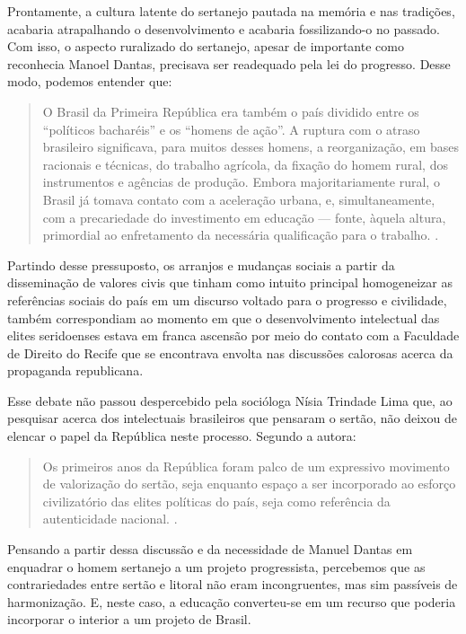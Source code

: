 \begin{refsection}
Prontamente, a cultura latente do sertanejo pautada na memória e nas tradições, acabaria atrapalhando o desenvolvimento e acabaria fossilizando-o no passado. Com isso, o aspecto ruralizado do sertanejo, apesar de importante como reconhecia Manoel Dantas, precisava ser readequado pela lei do progresso. Desse modo, podemos entender que:

\begin{quotation}
    O Brasil da Primeira República era também o país dividido entre os ``políticos bacharéis'' e os ``homens de ação''. A ruptura com o atraso brasileiro significava, para muitos desses homens, a reorganização, em bases racionais e técnicas, do trabalho agrícola, da fixação do homem rural, dos instrumentos e agências de produção. Embora majoritariamente rural, o Brasil já tomava contato com a aceleração urbana, e, simultaneamente, com a precariedade do investimento em educação --- fonte, àquela altura, primordial ao enfretamento da necessária qualificação para o trabalho. \cite[p.~320]{Bomeny2014Educacao}.
\end{quotation}

Partindo desse pressuposto, os arranjos e mudanças sociais a partir da disseminação de valores civis que tinham como intuito principal homogeneizar as referências sociais do país em um discurso voltado para o progresso e civilidade, também correspondiam ao momento em que o desenvolvimento intelectual das elites seridoenses estava em franca ascensão por meio do contato com a Faculdade de Direito do Recife que se encontrava envolta nas discussões calorosas acerca da propaganda republicana.  

Esse debate não passou despercebido pela socióloga Nísia Trindade Lima \citeyear{Lima2013Sertao} que, ao pesquisar acerca dos intelectuais brasileiros que pensaram o sertão, não deixou de elencar o papel da República neste processo. Segundo a autora:

\begin{quotation}
    Os primeiros anos da República foram palco de um expressivo movimento de valorização do sertão, seja enquanto espaço a ser incorporado ao esforço civilizatório das elites políticas do país, seja como referência da autenticidade nacional. \cite[p.~114]{Lima2013Sertao}.
\end{quotation}

Pensando a partir dessa discussão e da necessidade de Manuel Dantas em enquadrar o homem sertanejo a um projeto progressista, percebemos que as contrariedades entre sertão e litoral não eram incongruentes, mas sim passíveis de harmonização. E, neste caso, a educação converteu-se em um recurso que poderia incorporar o interior a um projeto de Brasil. 


\end{refsection}
